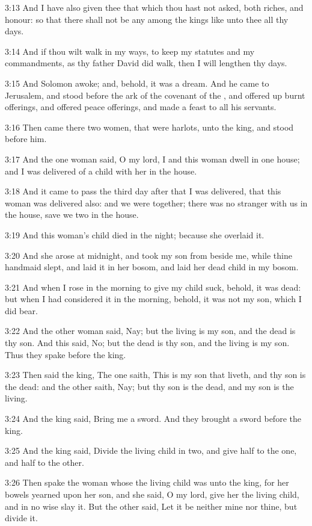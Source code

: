 3:13 And I have also given thee that which thou hast not asked, both
riches, and honour: so that there shall not be any among the kings
like unto thee all thy days.

3:14 And if thou wilt walk in my ways, to keep my statutes and my
commandments, as thy father David did walk, then I will lengthen thy
days.

3:15 And Solomon awoke; and, behold, it was a dream. And he came to
Jerusalem, and stood before the ark of the covenant of the \LORD, and
offered up burnt offerings, and offered peace offerings, and made a
feast to all his servants.

3:16 Then came there two women, that were harlots, unto the king, and
stood before him.

3:17 And the one woman said, O my lord, I and this woman dwell in one
house; and I was delivered of a child with her in the house.

3:18 And it came to pass the third day after that I was delivered,
that this woman was delivered also: and we were together; there was no
stranger with us in the house, save we two in the house.

3:19 And this woman's child died in the night; because she overlaid
it.

3:20 And she arose at midnight, and took my son from beside me, while
thine handmaid slept, and laid it in her bosom, and laid her dead
child in my bosom.

3:21 And when I rose in the morning to give my child suck, behold, it
was dead: but when I had considered it in the morning, behold, it was
not my son, which I did bear.

3:22 And the other woman said, Nay; but the living is my son, and the
dead is thy son. And this said, No; but the dead is thy son, and the
living is my son. Thus they spake before the king.

3:23 Then said the king, The one saith, This is my son that liveth,
and thy son is the dead: and the other saith, Nay; but thy son is the
dead, and my son is the living.

3:24 And the king said, Bring me a sword. And they brought a sword
before the king.

3:25 And the king said, Divide the living child in two, and give half
to the one, and half to the other.

3:26 Then spake the woman whose the living child was unto the king,
for her bowels yearned upon her son, and she said, O my lord, give her
the living child, and in no wise slay it. But the other said, Let it
be neither mine nor thine, but divide it.

